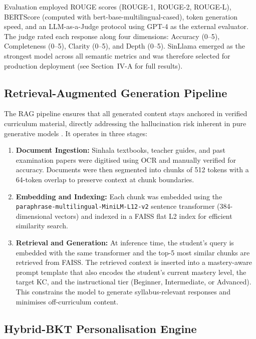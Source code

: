 \documentclass[conference]{IEEEtran}
\begin{document}
Evaluation employed ROUGE scores (ROUGE-1, ROUGE-2, ROUGE-L), BERTScore (computed with bert-base-multilingual-cased), token generation speed, and an LLM-as-a-Judge protocol \cite{b34} using GPT-4 as the external evaluator. The judge rated each response along four dimensions: Accuracy (0--5), Completeness (0--5), Clarity (0--5), and Depth (0--5). SinLlama emerged as the strongest model across all semantic metrics and was therefore selected for production deployment (see Section~IV-A for full results).

\vspace{-1em}
\subsection{Retrieval-Augmented Generation Pipeline}

The RAG pipeline ensures that all generated content stays anchored in verified curriculum material, directly addressing the hallucination risk inherent in pure generative models \cite{b26}. It operates in three stages:

\begin{enumerate}
\item \textbf{Document Ingestion:} Sinhala textbooks, teacher guides, and past examination papers were digitised using OCR and manually verified for accuracy. Documents were then segmented into chunks of 512 tokens with a 64-token overlap to preserve context at chunk boundaries.

\item \textbf{Embedding and Indexing:} Each chunk was embedded using the \texttt{paraphrase-multilingual-MiniLM-L12-v2} sentence transformer (384-dimensional vectors) and indexed in a FAISS flat L2 index for efficient similarity search.

\item \textbf{Retrieval and Generation:} At inference time, the student's query is embedded with the same transformer and the top-5 most similar chunks are retrieved from FAISS. The retrieved context is inserted into a mastery-aware prompt template that also encodes the student's current mastery level, the target KC, and the instructional tier (Beginner, Intermediate, or Advanced). This constrains the model to generate syllabus-relevant responses and minimises off-curriculum content.
\end{enumerate}

\subsection{Hybrid-BKT Personalisation Engine}
\end{document}
